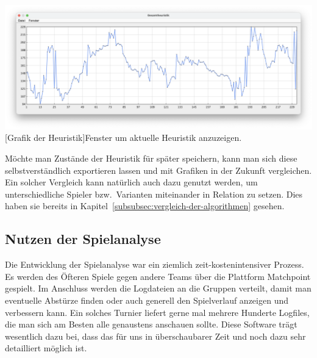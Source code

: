 \vspace{1em}
\begin{minipage}{\linewidth}
    \centering
    \includegraphics[width=0.8\linewidth]{pics/heuristic}
    [Grafik der Heuristik]{Fenster um aktuelle Heuristik anzuzeigen.}
    \label{fig:heuristic}
\end{minipage}

M\"ochte man Zust\"ande der Heuristik f\"ur sp\"ater speichern, kann man sich diese selbstverst\"andlich exportieren lassen und mit Grafiken in der Zukunft vergleichen.
Ein solcher Vergleich kann nat\"urlich auch dazu genutzt werden, um unterschiedliche Spieler bzw.\ Varianten miteinander in Relation zu setzen.
Dies haben sie bereits in Kapitel~\ref{subsubsec:vergleich-der-algorithmen} gesehen.

\subsection{Nutzen der Spielanalyse}\label{subsec:nutzen-der-spielanalyse}
Die Entwicklung der Spielanalyse war ein ziemlich zeit-kostenintensiver Prozess.
Es werden des \"Ofteren Spiele gegen andere Teams \"uber die Plattform Matchpoint gespielt.
Im Anschluss werden die Logdateien an die Gruppen verteilt, damit man eventuelle Abst\"urze finden oder auch generell den Spielverlauf anzeigen und verbessern kann.
Ein solches Turnier liefert gerne mal mehrere Hunderte Logfiles, die man sich am Besten alle genaustens anschauen sollte.
Diese Software tr\"agt wesentlich dazu bei, dass das f\"ur uns in \"uberschaubarer Zeit und noch dazu sehr detailliert m\"oglich ist.


\bigskip
\newpage